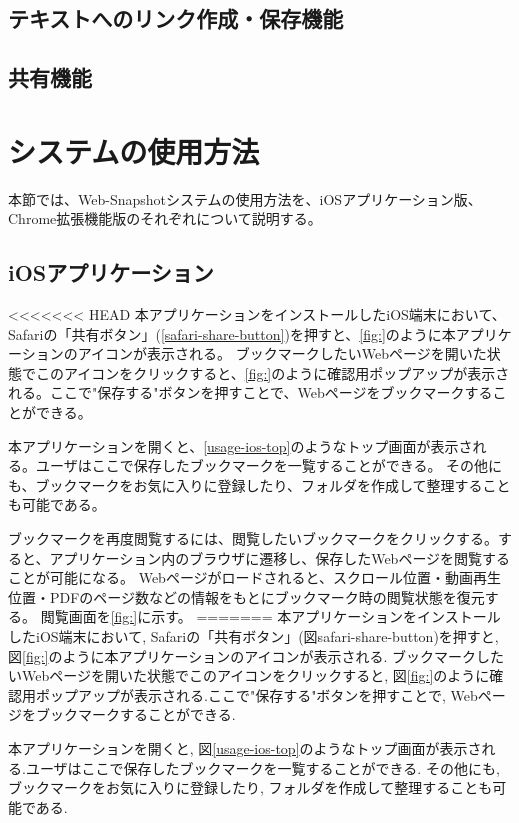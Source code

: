 \subsection{テキストへのリンク作成・保存機能}
\subsection{共有機能}

\section{システムの使用方法}
本節では、Web-Snapshotシステムの使用方法を、iOSアプリケーション版、Chrome拡張機能版のそれぞれについて説明する。

\subsection{iOSアプリケーション}
<<<<<<< HEAD
本アプリケーションをインストールしたiOS端末において、Safariの「共有ボタン」(\ref{safari-share-button})を押すと、\ref{fig:}のように本アプリケーションのアイコンが表示される。
ブックマークしたいWebページを開いた状態でこのアイコンをクリックすると、\ref{fig:}のように確認用ポップアップが表示される。ここで"保存する"ボタンを押すことで、Webページをブックマークすることができる。

本アプリケーションを開くと、\ref{usage-ios-top}のようなトップ画面が表示される。ユーザはここで保存したブックマークを一覧することができる。
その他にも、ブックマークをお気に入りに登録したり、フォルダを作成して整理することも可能である。

ブックマークを再度閲覧するには、閲覧したいブックマークをクリックする。すると、アプリケーション内のブラウザに遷移し、保存したWebページを閲覧することが可能になる。
Webページがロードされると、スクロール位置・動画再生位置・PDFのページ数などの情報をもとにブックマーク時の閲覧状態を復元する。
閲覧画面を\ref{fig:}に示す。
=======
本アプリケーションをインストールしたiOS端末において, Safariの「共有ボタン」(図{safari-share-button})を押すと, 図\ref{fig:}のように本アプリケーションのアイコンが表示される.
ブックマークしたいWebページを開いた状態でこのアイコンをクリックすると, 図\ref{fig:}のように確認用ポップアップが表示される.ここで"保存する"ボタンを押すことで, Webページをブックマークすることができる.

本アプリケーションを開くと, 図\ref{usage-ios-top}のようなトップ画面が表示される.ユーザはここで保存したブックマークを一覧することができる.
その他にも, ブックマークをお気に入りに登録したり, フォルダを作成して整理することも可能である.

